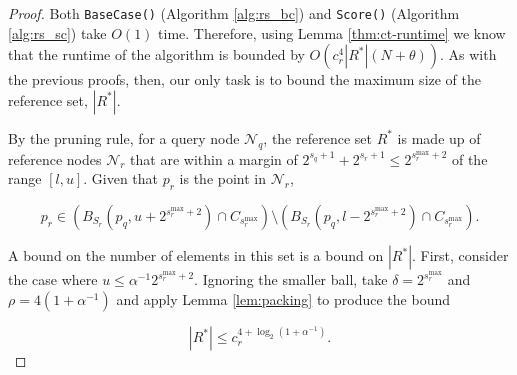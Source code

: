 \begin{proof}
Both \texttt{BaseCase()} (Algorithm \ref{alg:rs_bc}) and \texttt{Score()}
(Algorithm \ref{alg:rs_sc}) take $O(1)$ time.  Therefore, using Lemma
\ref{thm:ct-runtime} we know that the runtime of the algorithm is bounded by
$O(c_r^4 |R^*| (N + \theta))$.  As with the previous proofs, then, our only task
is to bound the maximum size of the reference set, $|R^*|$.

By the pruning rule, for a query node $\mathscr{N}_q$, the reference set $R^*$
is made up of reference nodes $\mathscr{N}_r$ that are within a margin of
$2^{s_q + 1} + 2^{s_r + 1} \le 2^{s_r^{\max} + 2}$ of the range $[l, u]$.  Given
that $p_r$ is the point in $\mathscr{N}_r$,

\begin{equation}
p_r \in \left( B_{S_r}(p_q, u + 2^{s_r^{\max} + 2}) \cap
C_{s_r^{\max}}\right)\setminus \left( B_{S_r}(p_q, l - 2^{s_r^{\max} + 2}) \cap
C_{s_r^{\max}} \right). \label{eqn:rsballs}
\end{equation}

A bound on the number of elements in this set is a bound on $|R^*|$.  %
First, consider the case where $u \le \alpha^{-1} 2^{s_r^{\max} + 2}$.  Ignoring
the smaller ball, take $\delta = 2^{s_r^{\max}}$ and $\rho = 4 (1 +
\alpha^{-1})$ and apply Lemma \ref{lem:packing} to produce the bound

\begin{equation}
|R^*| \le c_r^{4 + \log_2(1 + \alpha^{-1})}.
\end{equation}



\end{proof}
